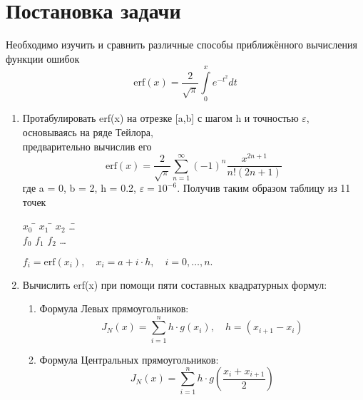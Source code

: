\documentclass[14pt]{article}
\begin{document}
\newpage
\begin{center}
\renewcommand{\contentsname}{Содержание}
\tableofcontents
\newpage
\end{center}
\newpage
\section{Постановка задачи}
\hspace{5mm}Необходимо изучить и сравнить различные способы приближённого вычисления функции ошибок
\begin{equation}
    \text{erf}(x) =\displaystyle\frac{2}{\sqrt{\pi}} \displaystyle\int\limits_{0}^{x} e^{-t^2} dt
\end{equation}
\begin{enumerate}
    \item Протабулировать erf(x) на отрезке [a,b] с шагом h и точностью $ \varepsilon$, основываясь на ряде Тейлора,\\
     предварительно вычислив его
     \begin{equation}
        \text{erf}(x) =\displaystyle\frac{2}{\sqrt{\pi}} \displaystyle\sum\limits_{n=1}^{\infty}(-1)^n\displaystyle\frac{x^{2n+1}}{n!(2n+1)}
     \end{equation}
    где a = 0, b = 2, h = 0.2, $\varepsilon = 10^{-6}$. Получив таким образом таблицу из 11 точек
    \begin{tabbing}
        $x_0$ \= $x_1$ \= $x_2$ \= \dots\\
        $f_0$ \> $f_1$ \> $f_2$ \> \dots\\
    \end{tabbing}
    $f_i = \text{erf}(x_i), \quad x_i = a + i \cdot h, \quad i = 0,\dots,n.$
    \item {Вычислить erf(x) при помощи пяти составных квадратурных формул:
        \begin{enumerate}
            \item {
                Формула Левых прямоугольников:
                \begin{equation}
                    J_N(x) = \displaystyle\sum_{i=1}^{n}h \cdot g(x_i), \quad h=(x_{i+1} - x_i)
                \end{equation}
                }
            \item {
                Формула Центральных прямоугольников:
                \begin{equation}
                    J_N(x) = \displaystyle\sum_{i=1}^{n}h \cdot g\left(\displaystyle\frac{x_i + x_{i+1}}{2}\right) 
                \end{equation}
}
\end{enumerate}}
\end{enumerate}
\end{document}

